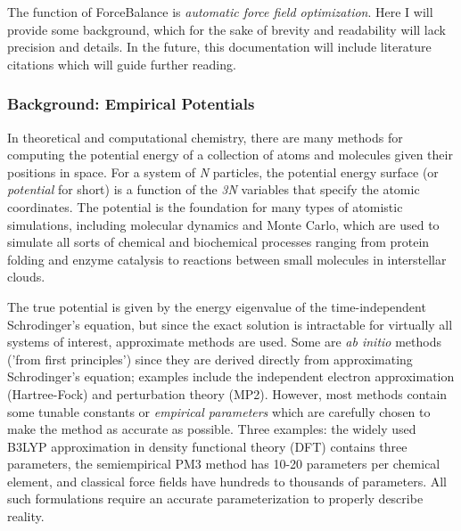 \-The function of \-Force\-Balance is {\itshape automatic force field optimization\/}. \-Here \-I will provide some background, which for the sake of brevity and readability will lack precision and details. \-In the future, this documentation will include literature citations which will guide further reading.\hypertarget{index_background}{}\subsubsection{\-Background\-: Empirical Potentials}\label{index_background}
\-In theoretical and computational chemistry, there are many methods for computing the potential energy of a collection of atoms and molecules given their positions in space. \-For a system of {\itshape \-N\/} particles, the potential energy surface (or {\itshape potential\/} for short) is a function of the {\itshape 3\-N\/} variables that specify the atomic coordinates. \-The potential is the foundation for many types of atomistic simulations, including molecular dynamics and \-Monte \-Carlo, which are used to simulate all sorts of chemical and biochemical processes ranging from protein folding and enzyme catalysis to reactions between small molecules in interstellar clouds.

\-The true potential is given by the energy eigenvalue of the time-\/independent \-Schrodinger's equation, but since the exact solution is intractable for virtually all systems of interest, approximate methods are used. \-Some are {\itshape ab initio\/} methods ('from first principles') since they are derived directly from approximating \-Schrodinger's equation; examples include the independent electron approximation (\-Hartree-\/\-Fock) and perturbation theory (\-M\-P2). \-However, most methods contain some tunable constants or {\itshape empirical parameters\/} which are carefully chosen to make the method as accurate as possible. \-Three examples\-: the widely used \-B3\-L\-Y\-P approximation in density functional theory (\-D\-F\-T) contains three parameters, the semiempirical \-P\-M3 method has 10-\/20 parameters per chemical element, and classical force fields have hundreds to thousands of parameters. \-All such formulations require an accurate parameterization to properly describe reality.


